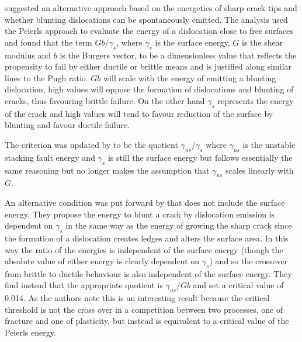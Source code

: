 


\citet{rice1974} suggested an alternative approach based on the energetics of sharp crack tips and whether blunting dislocations can be spontaneously emitted. The analysis used the Peierls approach to evaluate the energy of a dislocation close to free surfaces and found that the term $Gb/\gamma_s$, where $\gamma_s$ is the surface energy, $G$ is the shear modulus and $b$ is the Burgers vector, to be a dimensionless value that reflects the propensity to fail by either ductile or brittle means and is justified along similar lines to the Pugh ratio. $Gb$ will scale with the energy of emitting a blunting dislocation, high values will oppose the formation of dislocations and blunting of cracks, thus favouring brittle failure. On the other hand $\gamma_s$ represents the energy of the crack and high values will tend to favour reduction of the surface by blunting and favour ductile failure. 

The criterion was updated by \citet{Rice1992} to be the quotient $\gamma_{us}/ \gamma_s$ where $\gamma_{us}$ is the unstable stacking fault energy and $\gamma_s$ is still the surface energy but follows essentially the same reasoning but no longer makes the assumption that $\gamma_{us}$ scales linearly with $G$.

An alternative condition was put forward by \citet{Zhou1994} that does not include the surface energy. They propose the energy to blunt a crack by dislocation emission is dependent on $\gamma_s$ in the same way as the energy of growing the sharp crack since the formation of a dislocation creates ledges and alters the surface area. In this way the ratio of the energies is independent of the surface energy (though the absolute value of either energy is clearly dependent on $\gamma_s$) and so the crossover from brittle to ductile behaviour is also independent of the surface energy. They find instead that the appropriate quotient is $\gamma_{us} / Gb$ and set a critical value of 0.014. As the authors note this is an interesting result because the critical threshold is not the cross over in a competition between two processes, one of fracture and one of plasticity, but instead is equivalent to a critical value of the Peierls energy.

